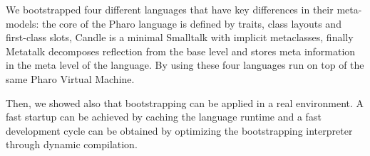 

We bootstrapped four different languages that have key differences in their meta-models: the core of the Pharo language is defined by traits, class layouts and first-class slots, Candle is a minimal Smalltalk with implicit metaclasses, finally Metatalk decomposes reflection from the base level and stores meta information in the meta level of the language. By using \Vtt these four languages run on top of the same Pharo Virtual Machine.

Then, we showed also that bootstrapping can be applied in a real environment. A fast startup can be achieved by caching the language runtime and a fast development cycle can be obtained by optimizing the bootstrapping interpreter through dynamic compilation.
